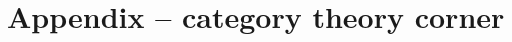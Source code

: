\documentclass[a4paper,parskip=half,numbers=enddot, DIV=12]{scrreprt}
\begin{document}
    
    
     
    
    
    
    \appendix
    \chapter{Appendix -- category theory corner}
\end{document}
